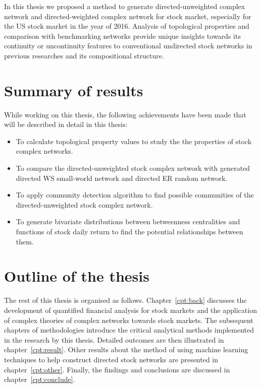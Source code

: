 In this thesis we proposed a method to generate directed-unweighted complex network and directed-weighted complex network for stock market, especially for the US stock market in the year of 2016. Analysis of topological properties and comparison with benchmarking networks provide unique insights towards its continuity or uncontinuity features to conventional undirected stock networks in previous researches and its compositional structure.

\section{Summary of results}
While working on this thesis, the following achievements have been made that will be described in detail in this thesis:

\begin{itemize}
	\item To calculate topological property values to study the the properties of stock complex networks.
	\item To compare the directed-unweighted stock complex network with generated directed WS small-world network and directed ER random network.
	\item To apply community detection algorithm to find possible communities of the directed-unweighted stock complex network.
	\item To generate bivariate distributions between betweenness centralities and functions of stock daily return to find the potential relationships between them.
\end{itemize}

\section{Outline of the thesis}
The rest of this thesis is organised as follows. Chapter~\ref{cpt:back} discusses the development of quantified financial analysis for stock markets and the application of complex theories of complex networks towards stock markets. The subsequent chapters of methodologies introduce the critical analytical methods implemented in the research by this thesis. Detailed outcomes are then illustrated in chapter~\ref{cpt:result}. Other results about the method of using machine learning techniques to help construct directed stock networks are presented in chapter~\ref{cpt:other}. Finally, the findings and conclusions are discussed in chapter~\ref{cpt:conclude}.
